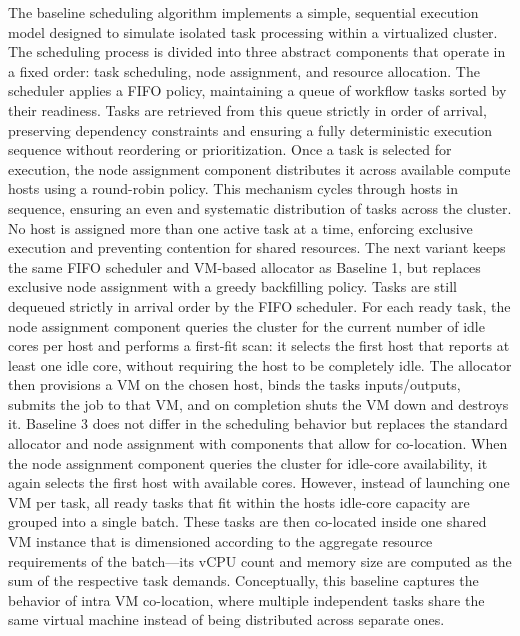 The baseline scheduling algorithm implements a simple, sequential execution model designed to simulate isolated task processing within a virtualized cluster. The scheduling process is divided into three abstract components that operate in a fixed order: task scheduling, node assignment, and resource allocation. The scheduler applies a FIFO policy, maintaining a queue of workflow tasks sorted by their readiness. Tasks are retrieved from this queue strictly in order of arrival, preserving dependency constraints and ensuring a fully deterministic execution sequence without reordering or prioritization.
Once a task is selected for execution, the node assignment component distributes it across available compute hosts using a round-robin policy. This mechanism cycles through hosts in sequence, ensuring an even and systematic distribution of tasks across the cluster. No host is assigned more than one active task at a time, enforcing exclusive execution and preventing contention for shared resources.
The next variant keeps the same FIFO scheduler and VM-based allocator as Baseline 1, but replaces exclusive node assignment with a greedy backfilling policy. Tasks are still dequeued strictly in arrival order by the FIFO scheduler. For each ready task, the node assignment component queries the cluster for the current number of idle cores per host and performs a first-fit scan: it selects the first host that reports at least one idle core, without requiring the host to be completely idle. The allocator then provisions a VM on the chosen host, binds the tasks inputs/outputs, submits the job to that VM, and on completion shuts the VM down and destroys it.
Baseline 3 does not differ in the scheduling behavior but replaces the standard allocator and node assignment with components that allow for co-location. When the node assignment component queries the cluster for idle-core availability, it again selects the first host with available cores. However, instead of launching one VM per task, all ready tasks that fit within the hosts idle-core capacity are grouped into a single batch. These tasks are then co-located inside one shared VM instance that is dimensioned according to the aggregate resource requirements of the batch—its vCPU count and memory size are computed as the sum of the respective task demands.
Conceptually, this baseline captures the behavior of intra VM co-location, where multiple independent tasks share the same virtual machine instead of being distributed across separate ones.
